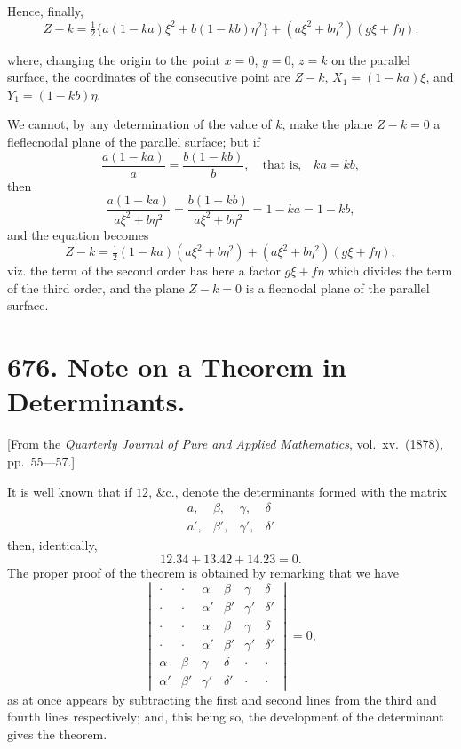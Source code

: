 \documentclass[12pt,a4paper]{article}
\theoremstyle{cayley}
\theoremstyle{definition}
\numberwithin{equation}{section}
\begin{document}
Hence, finally,
\[
Z - k = \tfrac{1}{2}\{a(1 - ka)\xi^2 + b(1 - kb)\eta^2\} + (a\xi^2 + b\eta^2)(g\xi + f\eta).
\]

where, changing the origin to the point $x = 0$, $y = 0$, $z = k$ on the parallel surface, the coordinates of the consecutive point are $Z - k$, $X_1 = (1 - ka)\xi$, and $Y_1 = (1 - kb)\eta$.

We cannot, by any determination of the value of $k$, make the plane $Z - k = 0$ a fleflecnodal plane of the parallel surface; but if
\[
\frac{a(1 - ka)}{a} = \frac{b(1 - kb)}{b}, \quad \text{that is,} \quad ka = kb,
\]
then
\[
\frac{a(1 - ka)}{a\xi^2 + b\eta^2} = \frac{b(1 - kb)}{a\xi^2 + b\eta^2} = 1 - ka = 1 - kb,
\]
and the equation becomes
\[
Z - k = \tfrac{1}{2}(1 - ka)(a\xi^2 + b\eta^2) + (a\xi^2 + b\eta^2)(g\xi + f\eta),
\]
viz. the term of the second order has here a factor $g\xi + f\eta$ which divides the term of the third order, and the plane $Z - k = 0$ is a flecnodal plane of the parallel surface.

\newpage

\section*{676. Note on a Theorem in Determinants.}

[From the \textit{Quarterly Journal of Pure and Applied Mathematics}, vol.\ xv.\ (1878), pp.\ 55---57.]

It is well known that if $12$, \&c., denote the determinants formed with the matrix
\[
\begin{matrix}
a, & \beta, & \gamma, & \delta \\
a', & \beta', & \gamma', & \delta'
\end{matrix}
\]
then, identically,
\[
12.34 + 13.42 + 14.23 = 0.
\]
The proper proof of the theorem is obtained by remarking that we have
\[
\begin{vmatrix}
\cdot & \cdot & \alpha & \beta & \gamma & \delta \\
\cdot & \cdot & \alpha' & \beta' & \gamma' & \delta' \\
\cdot & \cdot & \alpha & \beta & \gamma & \delta \\
\cdot & \cdot & \alpha' & \beta' & \gamma' & \delta' \\
\alpha & \beta & \gamma & \delta & \cdot & \cdot \\
\alpha' & \beta' & \gamma' & \delta' & \cdot & \cdot
\end{vmatrix} = 0,
\]
as at once appears by subtracting the first and second lines from the third and fourth lines respectively; and, this being so, the development of the determinant gives the theorem.
\end{document}
